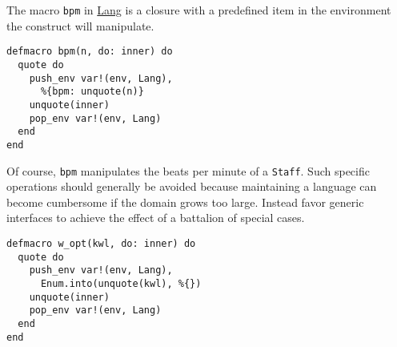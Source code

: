 \documentclass[11pt]{article}
\begin{document}
The macro \verb~bpm~ in \href{lib/lang.ex}{Lang} is a closure with a predefined item in the
environment the construct will manipulate.
\begin{verbatim}
defmacro bpm(n, do: inner) do
  quote do
    push_env var!(env, Lang),
      %{bpm: unquote(n)}
    unquote(inner)
    pop_env var!(env, Lang)
  end
end
\end{verbatim}
Of course, \verb~bpm~ manipulates the beats per minute of a
\verb~Staff~. Such specific operations should generally be avoided
because maintaining a language can become cumbersome if the domain
grows too large. Instead favor generic interfaces to achieve the
effect of a battalion of special cases.
\begin{verbatim}
defmacro w_opt(kwl, do: inner) do
  quote do
    push_env var!(env, Lang),
      Enum.into(unquote(kwl), %{})
    unquote(inner)
    pop_env var!(env, Lang)
  end
end
\end{verbatim}
\end{document}

